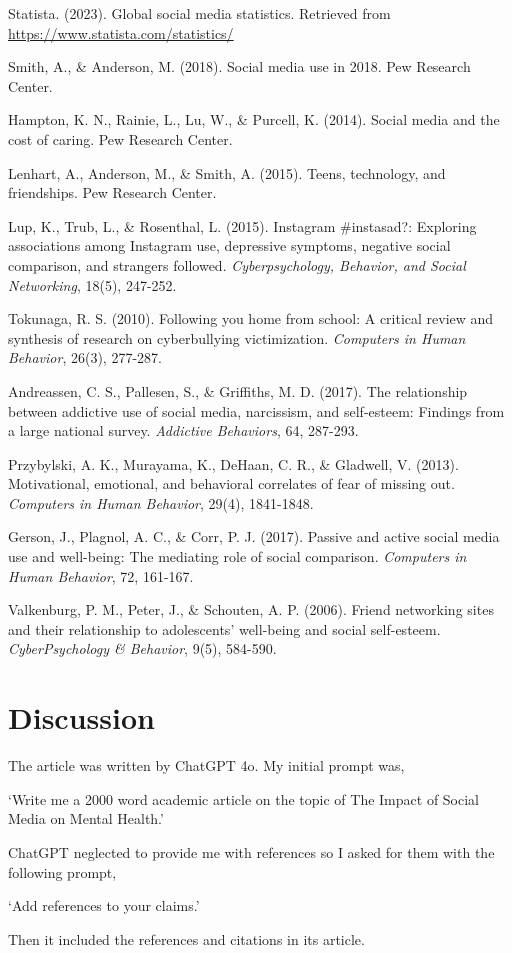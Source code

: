 \documentclass[12pt]{article}
\begin{document}
\begin{thebibliography}{9}

 Statista. (2023). Global social media statistics. Retrieved from \url{https://www.statista.com/statistics/}

 Smith, A., \& Anderson, M. (2018). Social media use in 2018. Pew Research Center.

 Hampton, K. N., Rainie, L., Lu, W., \& Purcell, K. (2014). Social media and the cost of caring. Pew Research Center.

 Lenhart, A., Anderson, M., \& Smith, A. (2015). Teens, technology, and friendships. Pew Research Center.

 Lup, K., Trub, L., \& Rosenthal, L. (2015). Instagram \#instasad?: Exploring associations among Instagram use, depressive symptoms, negative social comparison, and strangers followed. \textit{Cyberpsychology, Behavior, and Social Networking}, 18(5), 247-252.

 Tokunaga, R. S. (2010). Following you home from school: A critical review and synthesis of research on cyberbullying victimization. \textit{Computers in Human Behavior}, 26(3), 277-287.

 Andreassen, C. S., Pallesen, S., \& Griffiths, M. D. (2017). The relationship between addictive use of social media, narcissism, and self-esteem: Findings from a large national survey. \textit{Addictive Behaviors}, 64, 287-293.

 Przybylski, A. K., Murayama, K., DeHaan, C. R., \& Gladwell, V. (2013). Motivational, emotional, and behavioral correlates of fear of missing out. \textit{Computers in Human Behavior}, 29(4), 1841-1848.

 Gerson, J., Plagnol, A. C., \& Corr, P. J. (2017). Passive and active social media use and well-being: The mediating role of social comparison. \textit{Computers in Human Behavior}, 72, 161-167.

 Valkenburg, P. M., Peter, J., \& Schouten, A. P. (2006). Friend networking sites and their relationship to adolescents’ well-being and social self-esteem. \textit{CyberPsychology \& Behavior}, 9(5), 584-590.

\end{thebibliography}

\section{Discussion}
The article was written by ChatGPT 4o. My initial prompt was,
\begin{center}
    `Write me a 2000 word academic article on the topic of The Impact of Social Media on Mental Health.'
\end{center}
ChatGPT neglected to provide me with references so I asked for them with the following prompt,
\begin{center}
    `Add references to your claims.'
\end{center}
Then it included the references and citations in its article.
\end{document}
